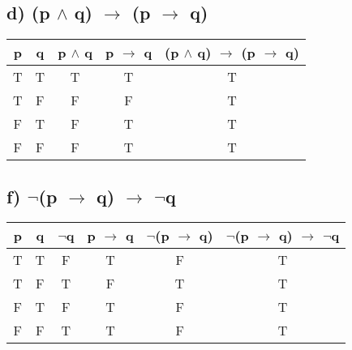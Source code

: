 \documentclass[11pt, oneside]{article} %
\numberwithin{equation}{section} %
\numberwithin{figure}{section} %
\begin{document}
\begin{table}[!htp]
\subsection{d) (p $\wedge$ q) $\rightarrow$ (p  $\rightarrow$ q)}
\begin{tabular}{c c c c c}
\hline\hline
p & q & p $\wedge$ q & p $\rightarrow$ q & (p $\wedge$ q) $\rightarrow$ (p  $\rightarrow$ q) \\ [0.5ex] %
\hline
T & T & T & T & T\\
T & F & F & F & T\\
F & T & F & T & T\\
F & F & F & T & T\\ [1ex]
\hline
\end{tabular}
\label{table:nonlin}
\end{table}

\begin{table}[!htp]
\subsection{f) $\neg$(p $\rightarrow$ q) $\rightarrow$ $\neg$q}
\begin{tabular}{c c c c c c}
\hline\hline
p & q & $\neg$q & p $\rightarrow$ q & $\neg$(p $\rightarrow$ q) & $\neg$(p $\rightarrow$ q) $\rightarrow$ $\neg$q\\ [0.5ex] %
\hline
T & T & F & T & F & T\\
T & F & T & F & T & T\\
F & T & F & T & F & T\\
F & F & T & T & F & T\\ [1ex]
\hline
\end{tabular}
\label{table:nonlin}
\end{table}
\end{document}

